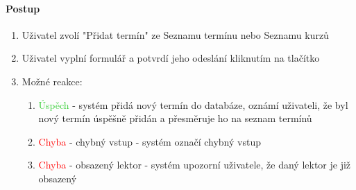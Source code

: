 \documentclass[12pt,a4paper,titlepage,final]{report}
\begin{document}
\paragraph{Postup}

\begin{enumerate}
	\item Uživatel zvolí "Přidat termín" ze Seznamu termínu nebo Seznamu kurzů
	\item Uživatel vyplní formulář a potvrdí jeho odeslání kliknutím na tlačítko
	\item Možné reakce:
	\begin{enumerate}
		\item \textcolor{LimeGreen}{Úspěch} - systém přidá nový termín do databáze, oznámí uživateli, že byl nový termín úspěšně přidán a přesměruje ho na seznam termínů
		\item \textcolor{Red}{Chyba} - chybný vstup - systém označí chybný vstup
		\item \textcolor{Red}{Chyba} - obsazený lektor - systém upozorní uživatele, že daný lektor je již obsazený
	\end{enumerate}
\end{enumerate}
\end{document}
